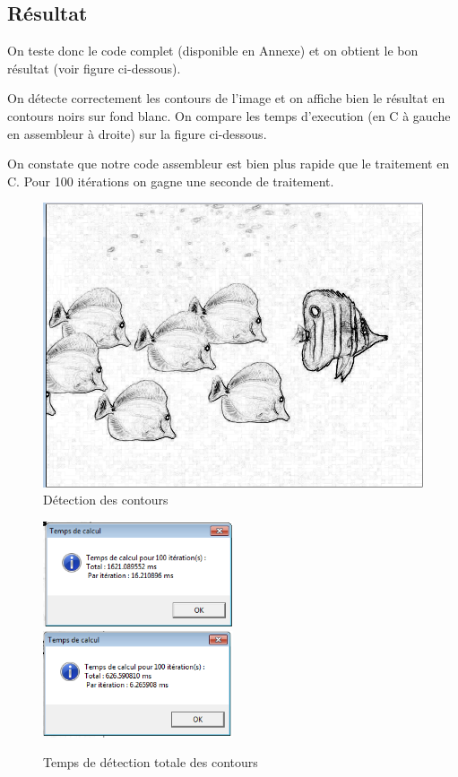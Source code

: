 \subsection{Résultat}
On teste donc le code complet (disponible en Annexe) et on obtient le bon résultat (voir figure ci-dessous).

\medskip

On détecte correctement les contours de l'image et on affiche bien le résultat en contours noirs sur fond blanc. On compare les temps d'execution (en C à gauche en assembleur à droite) sur la figure ci-dessous.

\medskip

On constate que notre code assembleur est bien plus rapide que le traitement en C. Pour 100 itérations on gagne une seconde de traitement.

\begin{figure}[!h]
   \centering\includegraphics[width=\textwidth]{img/contours.png}
   \caption{Détection des contours}
\end{figure}

\begin{figure}[!h]
   \includegraphics[width=0.5\textwidth]{img/contours_c.png}
   \includegraphics[width=0.5\textwidth]{img/contours_assembly.png}
   \caption{Temps de détection totale des contours}
\end{figure}